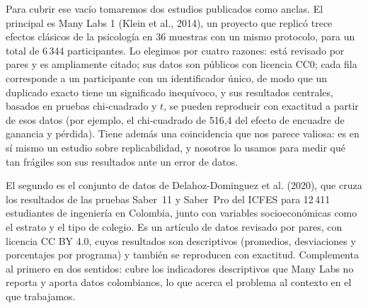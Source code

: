 \documentclass[11pt,openany,oneside,letterpaper]{book}
\begin{document}
Para cubrir ese vacío tomaremos dos estudios publicados como anclas. El principal es Many Labs 1 (Klein et al., 2014), un proyecto que replicó trece efectos clásicos de la psicología en 36 muestras con un mismo protocolo, para un total de 6\,344 participantes. Lo elegimos por cuatro razones: está revisado por pares y es ampliamente citado; sus datos son públicos con licencia CC0; cada fila corresponde a un participante con un identificador único, de modo que un duplicado exacto tiene un significado inequívoco, y sus resultados centrales, basados en pruebas chi-cuadrado y $t$, se pueden reproducir con exactitud a partir de esos datos (por ejemplo, el chi-cuadrado de 516,4 del efecto de encuadre de ganancia y pérdida). Tiene además una coincidencia que nos parece valiosa: es en sí mismo un estudio sobre replicabilidad, y nosotros lo usamos para medir qué tan frágiles son sus resultados ante un error de datos.

El segundo es el conjunto de datos de Delahoz-Dominguez et al. (2020), que cruza los resultados de las pruebas Saber~11 y Saber~Pro del ICFES para 12\,411 estudiantes de ingeniería en Colombia, junto con variables socioeconómicas como el estrato y el tipo de colegio. Es un artículo de datos revisado por pares, con licencia CC BY 4.0, cuyos resultados son descriptivos (promedios, desviaciones y porcentajes por programa) y también se reproducen con exactitud. Complementa al primero en dos sentidos: cubre los indicadores descriptivos que Many Labs no reporta y aporta datos colombianos, lo que acerca el problema al contexto en el que trabajamos.
\end{document}
